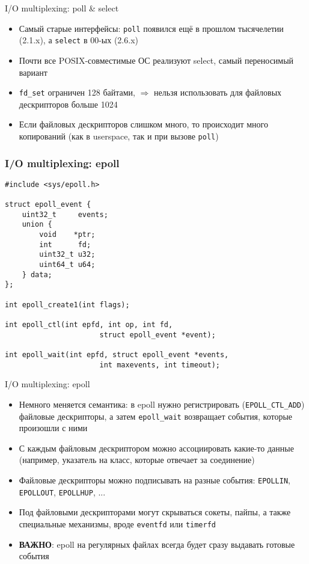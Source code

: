 \documentclass[10pt,pdf,hyperref={unicode}]{beamer}
\begin{document}
\begin{frame}{I/O multiplexing: poll \& select}
\begin{itemize}
    \item Самый старые интерфейсы: \texttt{poll} появился ещё в прошлом тысячелетии (2.1.x), а \texttt{select} в 00-ых (2.6.x)
    \item Почти все POSIX-совместимые ОС реализуют select, самый переносимый вариант
    \item \texttt{fd_set} ограничен 128 байтами, $\Rightarrow$ нельзя использовать для файловых дескрипторов больше 1024
    \item Если файловых дескрипторов слишком много, то происходит много копирований (как в userspace, так и при вызове \texttt{poll})
\end{itemize}
\end{frame}

\begin{frame}[fragile]
\frametitle{I/O multiplexing: epoll}
\begin{center}
\begin{minipage}{0.95\textwidth}
\begin{verbatim}
#include <sys/epoll.h>

struct epoll_event {
    uint32_t     events;
    union {
        void    *ptr;
        int      fd;
        uint32_t u32;
        uint64_t u64;
    } data;
};

int epoll_create1(int flags);

int epoll_ctl(int epfd, int op, int fd,
                      struct epoll_event *event);

int epoll_wait(int epfd, struct epoll_event *events,
                      int maxevents, int timeout);

\end{verbatim}
\end{minipage}
\end{center}
\end{frame}

\begin{frame}{I/O multiplexing: epoll}
\begin{itemize}
    \item Немного меняется семантика: в epoll нужно регистрировать (\texttt{EPOLL_CTL_ADD}) файловые дескрипторы, а затем \texttt{epoll_wait} возвращает события, которые произошли с ними
    \item С каждым файловым дескриптором можно ассоциировать какие-то данные (например, указатель на класс, которые отвечает за соединение)
    \item Файловые дескрипторы можно подписывать на разные события: \texttt{EPOLLIN}, \texttt{EPOLLOUT}, \texttt{EPOLLHUP}, ...
    \item Под файловыми дескрипторами могут скрываться сокеты, пайпы, а также специальные механизмы, вроде \texttt{eventfd} или \texttt{timerfd}
    \item \textbf{ВАЖНО}: epoll на регулярных файлах всегда будет сразу выдавать готовые события
\end{itemize}
\end{frame}
\end{document}
